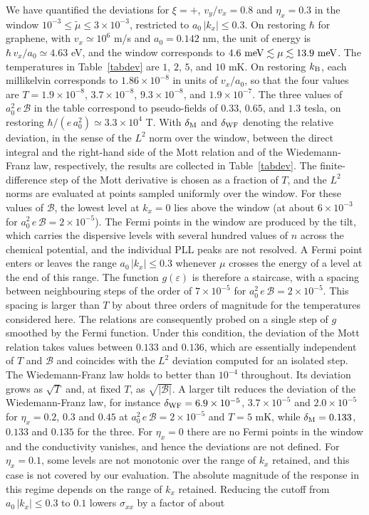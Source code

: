 \documentclass[aps,prb, onecolumn, nofootinbib, citeautoscript,10pt]{revtex4-2}
\newcommand{\red}[1]{{\color{red}#1}}
\begin{document}
We have quantified the deviations for $\xi=+$, $v_y/v_x=0.8$ and $\eta_x=0.3$ in the window $10^{-3}\le\tilde\mu\le3\times10^{-3}$, restricted to $a_0\,|k_x|\le0.3$. On restoring $\hbar$ for graphene, with $v_x\simeq10^6$ m/s and $a_0=0.142$ nm, the unit of energy is $\hbar\,v_x/a_0\simeq4.63$ eV, and the window corresponds to $4.6\ {\rm meV}\lesssim\mu\lesssim13.9\ {\rm meV}$. The temperatures in Table~\ref{tabdev} are $1$, $2$, $5$, and $10$ mK. On restoring $k_{\rm B}$, each millikelvin corresponds to $1.86\times10^{-8}$ in units of $v_x/a_0$, so that the four values are $T=1.9\times10^{-8}$, $3.7\times10^{-8}$, $9.3\times10^{-8}$, and $1.9\times10^{-7}$. The three values of $a_0^2\,e\,\mathcal B$ in the table correspond to pseudo-fields of $0.33$, $0.65$, and $1.3$ tesla, on restoring $\hbar/(e\,a_0^2)\simeq3.3\times10^{4}$ T. With $\delta_{\rm M}$ and $\delta_{\rm WF}$ denoting the relative deviation, in the sense of the $L^2$ norm over the window, between the direct integral and the right-hand side of the Mott relation and of the Wiedemann-Franz law, respectively, the results are collected in Table~\ref{tabdev}.\red{ The finite-difference step of the Mott derivative is chosen as a fraction of $T$, and the $L^2$ norms are evaluated at points sampled uniformly over the window.} For these values of $\mathcal B$, the lowest level at $k_x=0$ lies above the window (at about $6\times10^{-3}$ for $a_0^2\,e\,\mathcal B=2\times10^{-5}$). The Fermi points in the window are produced by the tilt, which carries the dispersive levels with \red{several hundred} values of $n$ across the chemical potential, and the individual PLL peaks are not resolved. A Fermi point enters or leaves the range $a_0\,|k_x|\le0.3$ whenever $\mu$ crosses the energy of a level at the end of this range. The function $g(\varepsilon)$ is therefore a staircase, with a spacing between neighbouring steps of the order of $7\times10^{-5}$ for $a_0^2\,e\,\mathcal B=2\times10^{-5}$. This spacing is larger than $T$ by about three orders of magnitude for the temperatures considered here. The relations are consequently probed on a single step of $g$ smoothed by the Fermi function. Under this condition, the deviation of the Mott relation takes \red{values between $0.133$ and $0.136$}, which are \red{essentially} independent of $T$ and $\mathcal B$ and coincides with the $L^2$ deviation computed for an isolated step. The Wiedemann-Franz law holds to better than $10^{-4}$ throughout. Its deviation grows as $\sqrt{T}$ and, at fixed $T$, as $\sqrt{|\mathcal B|}$. A larger tilt reduces the deviation of the Wiedemann-Franz law, for instance \red{$\delta_{\rm WF}=6.9\times10^{-5}$}, $3.7\times10^{-5}$ and $2.0\times10^{-5}$ for $\eta_x=0.2$, $0.3$ and $0.45$ at $a_0^2\,e\,\mathcal B=2\times10^{-5}$ and $T=5$ mK, while \red{$\delta_{\rm M}=0.133$, $0.133$ and $0.135$ for the three}. For $\eta_x=0$ there are no Fermi points in the window and the conductivity vanishes, and hence the deviations are not defined. For $\eta_x=0.1$, some levels are not monotonic over the range of $k_x$ retained, and this case is not covered by our evaluation. The absolute magnitude of the response in this regime depends on the range of $k_x$ retained. Reducing the cutoff from $a_0\,|k_x|\le0.3$ to $0.1$ lowers $\sigma_{xx}$ by a factor of about 
\end{document}

